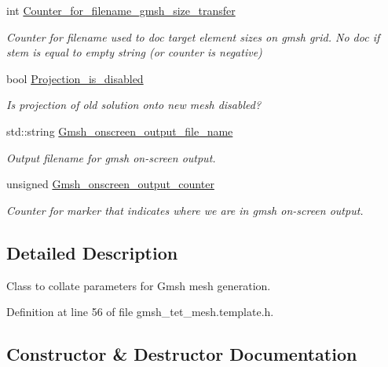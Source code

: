 \begin{DoxyCompactItemize}
int \hyperlink{classoomph_1_1GmshParameters_af6ca2a71d6aae3f8c51e9b4ad53b787a}{Counter\+\_\+for\+\_\+filename\+\_\+gmsh\+\_\+size\+\_\+transfer}
\begin{DoxyCompactList}\small\item\em Counter for filename used to doc target element sizes on gmsh grid. No doc if stem is equal to empty string (or counter is negative) \end{DoxyCompactList}\item 
bool \hyperlink{classoomph_1_1GmshParameters_aebabc7ca82ac23e87e164655b6dc9bb4}{Projection\+\_\+is\+\_\+disabled}
\begin{DoxyCompactList}\small\item\em Is projection of old solution onto new mesh disabled? \end{DoxyCompactList}\item 
std\+::string \hyperlink{classoomph_1_1GmshParameters_af2da0d4c57e32c06c70a6aa25d1461ac}{Gmsh\+\_\+onscreen\+\_\+output\+\_\+file\+\_\+name}
\begin{DoxyCompactList}\small\item\em Output filename for gmsh on-\/screen output. \end{DoxyCompactList}\item 
unsigned \hyperlink{classoomph_1_1GmshParameters_ab3648c8847da428cddca41e676042e33}{Gmsh\+\_\+onscreen\+\_\+output\+\_\+counter}
\begin{DoxyCompactList}\small\item\em Counter for marker that indicates where we are in gmsh on-\/screen output. \end{DoxyCompactList}\end{DoxyCompactItemize}


\subsection{Detailed Description}
Class to collate parameters for Gmsh mesh generation. 

Definition at line 56 of file gmsh\+\_\+tet\+\_\+mesh.\+template.\+h.



\subsection{Constructor \& Destructor Documentation}
\mbox{\label{classoomph_1_1GmshParameters_a6a4e43f09a5de3155dee5b3d5c1a206b}} 
